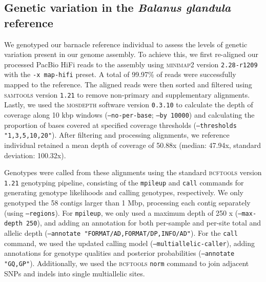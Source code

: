 \documentclass[11pt]{article}
\newcommand{\balgla}{\textit{Balanus glandula}\xspace}
\begin{document}
\subsection*{Genetic variation in the \balgla{} reference}\label{sec:methods_ref_geno}

We genotyped our barnacle reference individual to assess the levels of genetic variation
present in our genome assembly.
To achieve this, we first re-aligned our processed PacBio HiFi reads to the assembly using
\textsc{minimap2} version \texttt{2.28-r1209} with the \texttt{-x map-hifi} preset.
A total of 99.97\% of reads were successfully mapped to the reference.
The aligned reads were then sorted and filtered using \textsc{samtools} version \texttt{1.21}
to remove non-primary and supplementary alignments.
Lastly, we used the \textsc{mosdepth} software version \texttt{0.3.10}
\citep{pedersen_mosdepth_2018} to calculate the depth of coverage along 10 kbp windows
(\texttt{--no-per-base}; \texttt{--by 10000}) and calculating the proportion of bases
covered at specified coverage thresholds (\texttt{--thresholds "1,3,5,10,20"}).
After filtering and processing alignments, we reference individual retained a mean
depth of coverage of 50.88x (median: 47.94x, standard deviation: 100.32x).
\vspace{0.2cm}

Genotypes were called from these alignments using the standard \textsc{bcftools} version
\texttt{1.21} \citep{danecek_bcftools_2021} genotyping pipeline, consisting of the
\texttt{mpileup} and \texttt{call} commands for generating genotype likelihoods and calling
genotypes, respectively.
We only genotyped the 58 contigs larger than 1 Mbp, processing each contig separately
(using \texttt{--regions}).
For \texttt{mpileup}, we only used a maximum depth of 250 x (\texttt{--max-depth 250}),
and adding an annotation for both per-sample and per-site total and allelic depth
(\texttt{--annotate "FORMAT/AD,FORMAT/DP,INFO/AD"}).
For the \texttt{call} command, we used the updated calling model
(\texttt{--multiallelic-caller}), adding annotations for genotype qualities and posterior
probabilities (\texttt{--annotate "GQ,GP"}).
Additionally, we used the \textsc{bcftools} \texttt{norm} command to join adjacent SNPs
and indels into single multiallelic sites.
\vspace{0.2cm}
\end{document}
